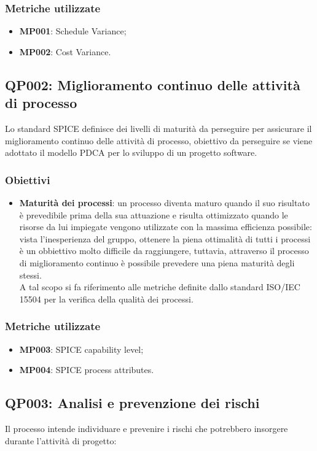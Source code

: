 \subsubsection{Metriche utilizzate}
\begin{itemize}
	\item \textbf{MP001}: Schedule Variance;
	\item \textbf{MP002}: Cost Variance.
\end{itemize}


\subsection{QP002: Miglioramento continuo delle attività di processo}
Lo standard SPICE definisce dei livelli di maturità da perseguire per assicurare il miglioramento continuo delle attività di processo, obiettivo da perseguire se viene adottato il modello PDCA per lo sviluppo di un progetto software.
\subsubsection{Obiettivi}
\begin{itemize}
	\item \textbf{Maturità dei processi}: un processo diventa maturo quando il suo risultato è prevedibile prima della sua attuazione e risulta ottimizzato quando le risorse da lui impiegate vengono utilizzate con la massima efficienza possibile: vista l'inesperienza del gruppo, ottenere la piena ottimalità di tutti i processi è un obbiettivo molto difficile da raggiungere, tuttavia, attraverso il processo di miglioramento continuo è possibile prevedere una piena maturità degli stessi.\\
	A tal scopo si fa riferimento alle metriche definite dallo standard ISO/IEC 15504 per la verifica della qualità dei processi.
\end{itemize}

\subsubsection{Metriche utilizzate}
\begin{itemize}
	\item \textbf{MP003}: SPICE capability level;
	\item \textbf{MP004}: SPICE process attributes.
\end{itemize}

\subsection{QP003: Analisi e prevenzione dei rischi}
Il processo intende individuare e prevenire i rischi che potrebbero insorgere durante l'attività di progetto:

